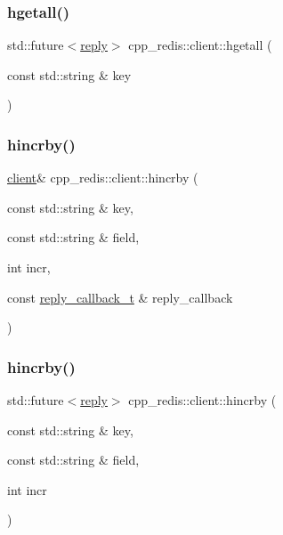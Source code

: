 \mbox{\label{classcpp__redis_1_1client_a44321960e02c6ee6b6b36ffc960e4257}} 
\subsubsection{\texorpdfstring{hgetall()}{hgetall()}\hspace{0.1cm}{\footnotesize\ttfamily [2/2]}}
{\footnotesize\ttfamily std\+::future$<$\hyperlink{classcpp__redis_1_1reply}{reply}$>$ cpp\+\_\+redis\+::client\+::hgetall (\begin{DoxyParamCaption}\item[{const std\+::string \&}]{key }\end{DoxyParamCaption})}

\mbox{\label{classcpp__redis_1_1client_a517b6bdeb07edf20f5e57eb1b4942dd5}} 
\subsubsection{\texorpdfstring{hincrby()}{hincrby()}\hspace{0.1cm}{\footnotesize\ttfamily [1/2]}}
{\footnotesize\ttfamily \hyperlink{classcpp__redis_1_1client}{client}\& cpp\+\_\+redis\+::client\+::hincrby (\begin{DoxyParamCaption}\item[{const std\+::string \&}]{key,  }\item[{const std\+::string \&}]{field,  }\item[{int}]{incr,  }\item[{const \hyperlink{classcpp__redis_1_1client_a061a1140d36d2eaeda82b09a0bb3f9f2}{reply\+\_\+callback\+\_\+t} \&}]{reply\+\_\+callback }\end{DoxyParamCaption})}

\mbox{\label{classcpp__redis_1_1client_aee1f9d8b1fe77bc5bed18000a9cf8b6f}} 
\subsubsection{\texorpdfstring{hincrby()}{hincrby()}\hspace{0.1cm}{\footnotesize\ttfamily [2/2]}}
{\footnotesize\ttfamily std\+::future$<$\hyperlink{classcpp__redis_1_1reply}{reply}$>$ cpp\+\_\+redis\+::client\+::hincrby (\begin{DoxyParamCaption}\item[{const std\+::string \&}]{key,  }\item[{const std\+::string \&}]{field,  }\item[{int}]{incr }\end{DoxyParamCaption})}

